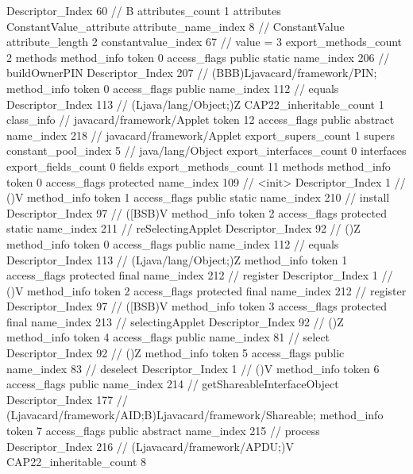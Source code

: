 {{{{{				Descriptor_Index	60		// B
				attributes_count	1
				attributes {
				ConstantValue_attribute {
					attribute_name_index	8		// ConstantValue
					attribute_length	2
					constantvalue_index	67		// value = 3
				}
				}
			}
			}
			export_methods_count	2
			methods {
				method_info {
					token	0
					access_flags	public static
					name_index	206		// buildOwnerPIN
					Descriptor_Index	207		// (BBB)Ljavacard/framework/PIN;
				}
				method_info {
					token	0
					access_flags	public
					name_index	112		// equals
					Descriptor_Index	113		// (Ljava/lang/Object;)Z
				}
			}
			CAP22_inheritable_count	1
		}
		class_info {		// javacard/framework/Applet
			token	12
			access_flags	public abstract
			name_index	218		// javacard/framework/Applet
			export_supers_count	1
			supers {
				constant_pool_index	5		// java/lang/Object
			}
			export_interfaces_count	0
			interfaces {
			}
			export_fields_count	0
			fields {
			}
			export_methods_count	11
			methods {
				method_info {
					token	0
					access_flags	protected
					name_index	109		// <init>
					Descriptor_Index	1		// ()V
				}
				method_info {
					token	1
					access_flags	public static
					name_index	210		// install
					Descriptor_Index	97		// ([BSB)V
				}
				method_info {
					token	2
					access_flags	protected static
					name_index	211		// reSelectingApplet
					Descriptor_Index	92		// ()Z
				}
				method_info {
					token	0
					access_flags	public
					name_index	112		// equals
					Descriptor_Index	113		// (Ljava/lang/Object;)Z
				}
				method_info {
					token	1
					access_flags	protected final
					name_index	212		// register
					Descriptor_Index	1		// ()V
				}
				method_info {
					token	2
					access_flags	protected final
					name_index	212		// register
					Descriptor_Index	97		// ([BSB)V
				}
				method_info {
					token	3
					access_flags	protected final
					name_index	213		// selectingApplet
					Descriptor_Index	92		// ()Z
				}
				method_info {
					token	4
					access_flags	public
					name_index	81		// select
					Descriptor_Index	92		// ()Z
				}
				method_info {
					token	5
					access_flags	public
					name_index	83		// deselect
					Descriptor_Index	1		// ()V
				}
				method_info {
					token	6
					access_flags	public
					name_index	214		// getShareableInterfaceObject
					Descriptor_Index	177		// (Ljavacard/framework/AID;B)Ljavacard/framework/Shareable;
				}
				method_info {
					token	7
					access_flags	public abstract
					name_index	215		// process
					Descriptor_Index	216		// (Ljavacard/framework/APDU;)V
				}
			}
			CAP22_inheritable_count	8
}}}

